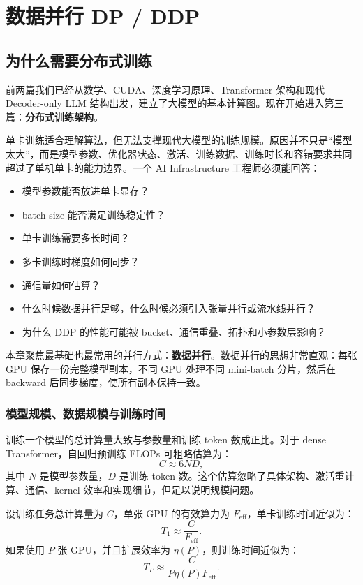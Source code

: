 \chapter{数据并行 DP / DDP}
\label{chap:data-parallelism}

\section{为什么需要分布式训练}
\label{sec:why-distributed-training}

前两篇我们已经从数学、CUDA、深度学习原理、Transformer 架构和现代 Decoder-only LLM 结构出发，建立了大模型的基本计算图。现在开始进入第三篇：\textbf{分布式训练架构}。

单卡训练适合理解算法，但无法支撑现代大模型的训练规模。原因并不只是“模型太大”，而是模型参数、优化器状态、激活、训练数据、训练时长和容错要求共同超过了单机单卡的能力边界。一个 AI Infrastructure 工程师必须能回答：

\begin{itemize}
\item 模型参数能否放进单卡显存？
\item batch size 能否满足训练稳定性？
\item 单卡训练需要多长时间？
\item 多卡训练时梯度如何同步？
\item 通信量如何估算？
\item 什么时候数据并行足够，什么时候必须引入张量并行或流水线并行？
\item 为什么 DDP 的性能可能被 bucket、通信重叠、拓扑和小参数层影响？
\end{itemize}

本章聚焦最基础也最常用的并行方式：\textbf{数据并行}。数据并行的思想非常直观：每张 GPU 保存一份完整模型副本，不同 GPU 处理不同 mini-batch 分片，然后在 backward 后同步梯度，使所有副本保持一致。

\subsection{模型规模、数据规模与训练时间}
\label{subsec:model-data-training-time}

训练一个模型的总计算量大致与参数量和训练 token 数成正比。对于 dense Transformer，自回归预训练 FLOPs 可粗略估算为：
\[
C \approx 6ND,
\]
其中 $N$ 是模型参数量，$D$ 是训练 token 数。这个估算忽略了具体架构、激活重计算、通信、kernel 效率和实现细节，但足以说明规模问题。

设训练任务总计算量为 $C$，单张 GPU 的有效算力为 $F_{\mathrm{eff}}$，单卡训练时间近似为：
\[
T_1 \approx \frac{C}{F_{\mathrm{eff}}}.
\]
如果使用 $P$ 张 GPU，并且扩展效率为 $\eta(P)$，则训练时间近似为：
\[
T_P \approx \frac{C}{P\eta(P)F_{\mathrm{eff}}}.
\]

